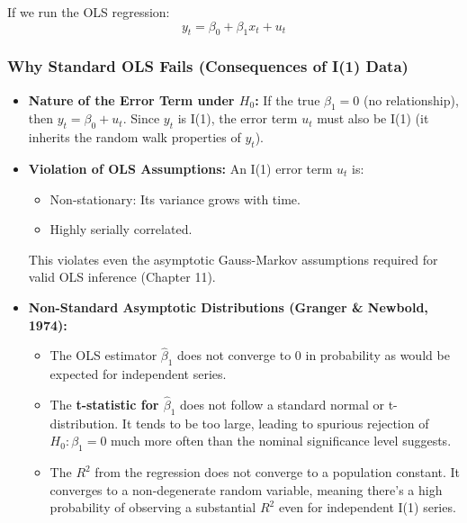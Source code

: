 \documentclass[a4paper, 10pt]{article}
\theoremstyle{definition}	%
\begin{document}
If we run the OLS regression:
\begin{equation} \label{eq:spurious_reg_model}
y_t = \beta_0 + \beta_1 x_t + u_t
\end{equation}

\subsubsection{Why Standard OLS Fails (Consequences of I(1) Data)}
\begin{itemize}
    \item \textbf{Nature of the Error Term under \(H_0\):} If the true \(\beta_1 = 0\) (no relationship), then \(y_t = \beta_0 + u_t\). Since \(y_t\) is I(1), the error term \(u_t\) must also be I(1) (it inherits the random walk properties of \(y_t\)).
    \item \textbf{Violation of OLS Assumptions:} An I(1) error term \(u_t\) is:
    \begin{itemize}
        \item Non-stationary: Its variance grows with time.
        \item Highly serially correlated.
    \end{itemize}
    This violates even the asymptotic Gauss-Markov assumptions required for valid OLS inference (Chapter 11).
    \item \textbf{Non-Standard Asymptotic Distributions (Granger \& Newbold, 1974):}
    \begin{itemize}
        \item The OLS estimator \(\hat{\beta}_1\) does not converge to 0 in probability as would be expected for independent series.
        \item The \textbf{t-statistic for \(\hat{\beta}_1\)} does not follow a standard normal or t-distribution. It tends to be too large, leading to spurious rejection of \(H_0: \beta_1 = 0\) much more often than the nominal significance level suggests.
        \item The \textbf{\(R^2\)} from the regression does not converge to a population constant. It converges to a non-degenerate random variable, meaning there's a high probability of observing a substantial \(R^2\) even for independent I(1) series.
    \end{itemize}
\end{itemize}
\end{document}
